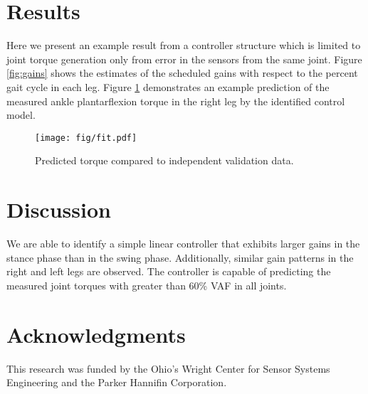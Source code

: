 \documentclass{dw2014}
\begin{document}
\section*{Results}
%
Here we present an example result from a controller structure which is limited
to joint torque generation only from error in the sensors from the same joint.
Figure \ref{fig:gains} shows the estimates of the scheduled gains with respect
to the percent gait cycle in each leg. Figure \ref{fig:fit} demonstrates an
example prediction of the measured ankle plantarflexion torque in the right leg
by the identified control model.
%
\begin{figure}[b]
  \begin{center}
    \texttt{[image: fig/fit.pdf]}
    \caption{Predicted torque compared to independent validation data.}
    \label{fig:fit}
  \end{center}
\end{figure}
%
\section*{Discussion}
%
We are able to identify a simple linear controller that exhibits larger gains
in the stance phase than in the swing phase. Additionally, similar gain
patterns in the right and left legs are observed. The controller is capable of
predicting the measured joint torques with greater than 60\% VAF in all joints.

\section*{Acknowledgments}

This research was funded by the Ohio's Wright Center for Sensor Systems
Engineering and the Parker Hannifin Corporation.
\end{document}
